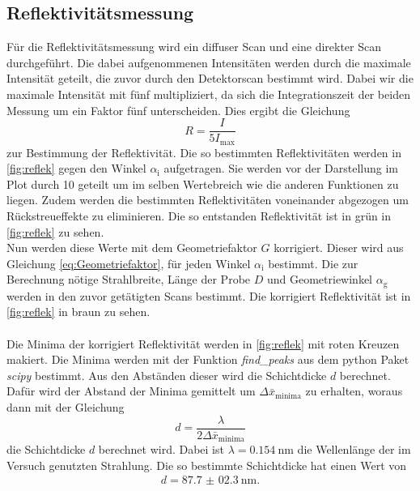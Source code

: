\subsection{Reflektivitätsmessung}
Für die Reflektivitätsmessung wird ein diffuser Scan und eine direkter Scan durchgeführt.
Die dabei aufgenommenen Intensitäten werden durch die maximale Intensität geteilt, die zuvor durch den Detektorscan bestimmt wird.
Dabei wir die maximale Intensität mit fünf multipliziert, da sich die Integrationszeit der beiden Messung um ein Faktor fünf unterscheiden.
Dies ergibt die Gleichung 
\begin{equation*}
    R = \frac{I}{5I_\text{max}}
\end{equation*} 
zur Bestimmung der Reflektivität.
Die so bestimmten Reflektivitäten werden in \autoref{fig:reflek} gegen den Winkel $\alpha_\text{i}$ aufgetragen.
Sie werden vor der Darstellung im Plot durch 10 geteilt um im selben Wertebreich wie die anderen Funktionen zu liegen.
Zudem werden die bestimmten Reflektivitäten voneinander abgezogen um Rückstreueffekte zu eliminieren.
Die so entstanden Reflektivität ist in grün in \autoref{fig:reflek} zu sehen.
\\
Nun werden diese Werte mit dem Geometriefaktor $G$ korrigiert.
Dieser wird aus Gleichung \eqref{eq:Geometriefaktor}, für jeden Winkel $\alpha_\text{i}$ bestimmt.
Die zur Berechnung nötige Strahlbreite, Länge der Probe $D$ und Geometriewinkel $\alpha_\text{g}$ werden in den zuvor getätigten Scans bestimmt.
Die korrigiert Reflektivität ist in \autoref{fig:reflek} in braun zu sehen.
\\\\
Die Minima der korrigiert Reflektivität werden in \autoref{fig:reflek} mit roten Kreuzen makiert.
Die Minima werden mit der Funktion \textit{find\_peaks} aus dem python Paket \textit{scipy} \cite{scipy} bestimmt.
Aus den Abständen dieser wird die Schichtdicke $d$ berechnet.
Dafür wird der Abstand der Minima gemittelt um $\Delta \bar{x} _\text{minima}$ zu erhalten, woraus dann mit der Gleichung
\begin{equation*}
    d = \frac{\lambda}{2\Delta \bar{x} _\text{minima}}
\end{equation*}
die Schichtdicke $d$ berechnet wird.
Dabei ist $\lambda = \SI{0.154}{\nano\meter}$ die Wellenlänge der im Versuch genutzten Strahlung.
Die so bestimmte Schichtdicke hat einen Wert von
\begin{align*}
    d = \SI{87.7(023)}{\nano\meter}.
\end{align*}

